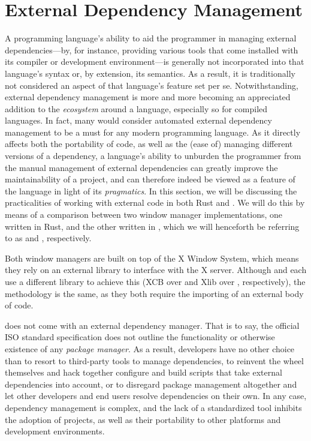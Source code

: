 \section{External Dependency Management}

A programming language's ability to aid the programmer in managing external
dependencies---by, for instance, providing various tools that come installed
with its compiler or development environment---is generally not incorporated
into that language's syntax or, by extension, its semantics. As a result, it is
traditionally not considered an aspect of that language's feature set per se.
Notwithstanding, external dependency management is more and more becoming an
appreciated addition to the \textit{ecosystem} around a language, especially
so for compiled languages. In fact, many would consider automated external
dependency management to be a must for any modern programming language. As
it directly affects both the portability of code, as well as the (ease of)
managing different versions of a dependency, a language's ability to unburden
the programmer from the manual management of external dependencies can greatly
improve the maintainability of a project, and can therefore indeed be viewed as
a feature of the language in light of its \textit{pragmatics}. In this section,
we will be discussing the practicalities of working with external code in both
Rust and \cpp. We will do this by means of a comparison between two window
manager implementations, one written in Rust, and the other written in \cpp,
which we will henceforth be referring to as \wmrs and \wmcpp, respectively.

Both window managers are built on top of the X Window System, which means
they rely on an external library to interface with the X server\cite{x11}.
Although \wmrs and \wmcpp each use a different library to achieve this (XCB over
\cite{xcb} and Xlib over \cite{xlib}, respectively), the
methodology is the same, as they both require the importing of an external body
of code.


\cpp does not come with an external dependency manager. That is to say, the
official ISO standard \cpp specification\cite{cppstd} does not outline the
functionality or otherwise existence of any \textit{package manager}. As a
result, developers have no other choice than to resort to third-party tools
to manage dependencies, to reinvent the wheel themselves and hack together
configure and build scripts that take external dependencies into account, or to
disregard package management altogether and let other developers and end users
resolve dependencies on their own. In any case, \cpp dependency management is
complex, and the lack of a standardized tool inhibits the adoption of \cpp
projects, as well as their portability to other platforms and development
environments.

